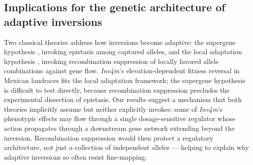 \documentclass[9pt,twocolumn,twoside]{rilabRxiv}
\newcommand{\invfour}{\textit{Inv4m}\xspace}
\begin{document}

\subsection*{Implications for the genetic architecture of adaptive inversions}
 
Two classical theories address how inversions become adaptive: the supergene hypothesis \citep{dobzhansky1971genetics}, invoking epistasis among captured alleles, and the local adaptation hypothesis \citep{kirkpatrick2006, kirkpatrick2010}, invoking recombination suppression of locally favored allele combinations against gene flow.
\invfour's elevation-dependent fitness reversal in Mexican landraces \citep{crow2020} fits the local adaptation framework; the supergene hypothesis is difficult to test directly, because recombination suppression precludes the experimental dissection of epistasis.
Our results suggest a mechanism that both theories implicitly assume but neither explicitly invokes: some of \invfour's phenotypic effects may flow through a single dosage-sensitive regulator whose action propagates through a downstream gene network extending beyond the inversion.
Recombination suppression would then protect a regulatory architecture, not just a collection of independent alleles --- helping to explain why adaptive inversions so often resist fine-mapping.
 
\end{document}
